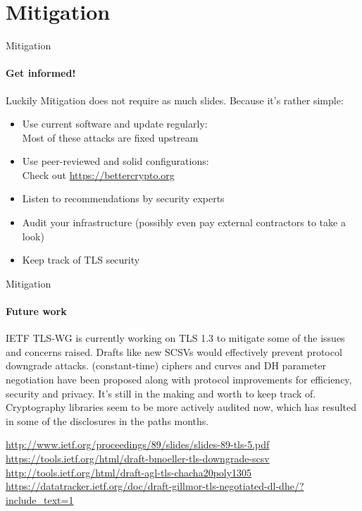 \documentclass[hyperref={draft}]{beamer}
\begin{document}
\section{Mitigation}

\begin{frame}{Mitigation}
  \framesubtitle{Get informed!}
  Luckily Mitigation does not require as much slides. Because it's rather simple:
  \begin{itemize}
    \item Use current software and update regularly:\\
      Most of these attacks are fixed upstream
    \item Use peer-reviewed and solid configurations:\\
      Check out \url{https://bettercrypto.org}
    \item Listen to recommendations by security experts
    \item Audit your infrastructure (possibly even pay external contractors to take a look)
    \item Keep track of TLS security
  \end{itemize}
\end{frame}

\begin{frame}{Mitigation}
  \framesubtitle{Future work}
  IETF TLS-WG is currently working on TLS 1.3 to mitigate some of the issues and concerns raised. 
  \newline
  \newline
  Drafts like new SCSVs would effectively prevent protocol downgrade attacks. (constant-time) ciphers and curves and DH parameter negotiation have been proposed along with protocol improvements for efficiency, security and privacy. It's still in the making and worth to keep track of.
  \newline
  \newline
  Cryptography libraries seem to be more actively audited now, which has resulted in some of the disclosures in the paths months.

  \vspace{15px}

  \tiny
  \url{http://www.ietf.org/proceedings/89/slides/slides-89-tls-5.pdf}\\
  \url{https://tools.ietf.org/html/draft-bmoeller-tls-downgrade-scsv}\\
  \url{http://tools.ietf.org/html/draft-agl-tls-chacha20poly1305}\\
  \url{https://datatracker.ietf.org/doc/draft-gillmor-tls-negotiated-dl-dhe/?include_text=1}\\
\end{frame}
\end{document}
